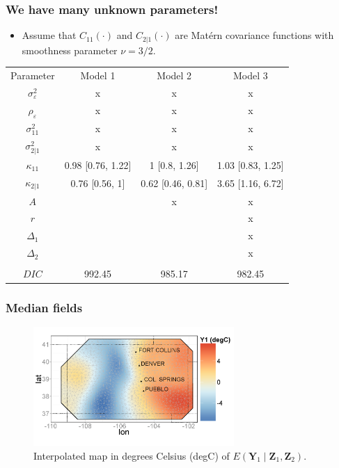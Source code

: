 \documentclass{beamer}
\newcommand{\Yvec}{\mathbf{Y}}
\newcommand{\Zvec}{\mathbf{Z}}
\newcommand{\E}{E}
\begin{document}
\begin{frame}
\frametitle{We have many unknown parameters!}

\begin{itemize}
\item Assume that $C_{11}(\cdot)$ and $C_{2|1}(\cdot)$ are Mat{\'e}rn covariance functions with smoothness parameter $\nu = 3/2$.
\end{itemize}
\small
\begin{center}
\begin{tabular} {cccc}
  { Parameter} 	& {Model 1} 	& {Model 2} & {Model 3} 			 \\ 
  $\sigma_\varepsilon^2$&  x & x & x \\
  $\rho_\varepsilon$&  x & x & x \\
  $\sigma^2_{11}$& x & x & x \\
  $\sigma^2_{2|1}$& x & x & x \\
  $\kappa_{11}$&0.98 [0.76, 1.22]&1 [0.8, 1.26]&1.03 [0.83, 1.25]\\
  $\kappa_{2|1}$&0.76 [0.56, 1]&0.62 [0.46, 0.81]&3.65 [1.16, 6.72]\\
  $A$&& x & x \\
  $r$&&& x \\
  $\Delta_1$&&& x\\
  $\Delta_2$&&& x \\
  &&&\\
  $DIC$&992.45&985.17&982.45
\end{tabular}
\end{center}
\normalsize
\end{frame}


\begin{frame}
\frametitle{Median fields}

\begin{figure}
\includegraphics[width=3in]{Fig3a1.png}
\caption{Interpolated map in degrees Celsius (degC) of $\E(\Yvec_1 \mid  \Zvec_1,\Zvec_2)$.}
\end{figure}
\end{frame}
\end{document}

